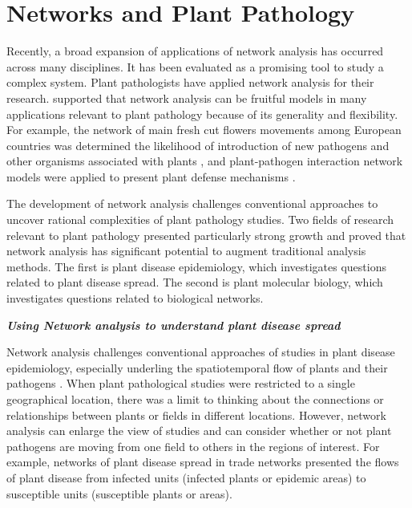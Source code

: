 \section*{Networks and Plant Pathology}

Recently, a broad expansion of applications of network analysis has occurred across many disciplines. It has been evaluated as a promising tool to study a complex system. Plant pathologists have applied network analysis for their research. \citet{Lefebvre:2011fo, Jeger:2007tn, windram2014network} supported that network analysis can be fruitful models in many applications relevant to plant pathology because of its generality and flexibility. For example, the network of main fresh cut flowers movements among European countries was determined the likelihood of introduction of new pathogens and other organisms associated with plants \citep{eagling2007australian}, and plant-pathogen interaction network models were applied to present plant defense mechanisms \citep{dietz2010hubs}. 

The development of network analysis challenges conventional approaches to uncover rational complexities of plant pathology studies. Two fields of research relevant to plant pathology presented particularly strong growth and proved that network analysis has significant potential to augment traditional analysis methods. The first is plant disease epidemiology, which investigates questions related to plant disease spread. The second is plant molecular biology, which investigates questions related to biological networks.

\textit{\textbf{Using Network analysis to understand plant disease spread}}

Network analysis challenges conventional approaches of studies in plant disease epidemiology, especially underling the spatiotemporal flow of plants and their pathogens \citep{Moslonka2010}. When plant pathological studies were restricted to a single geographical location, there was a limit to thinking about the connections or relationships between plants or fields in different locations. However, network analysis can enlarge the view of studies and can consider whether or not plant pathogens are moving from one field to others in the regions of interest. For example, networks of plant disease spread in trade networks presented the flows of plant disease from infected units (infected plants or epidemic areas) to susceptible units (susceptible plants or areas).

